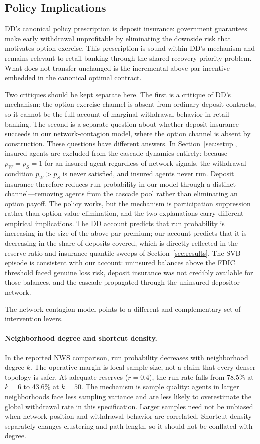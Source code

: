 \documentclass[12pt]{article}\usepackage[]{graphicx}\usepackage[]{xcolor}
\begin{document}
\subsection{Policy Implications}

DD's canonical policy prescription is deposit insurance: government guarantees make early withdrawal unprofitable by eliminating the downside risk that motivates option exercise.
This prescription is sound within DD's mechanism and remains relevant to retail banking through the shared recovery-priority problem.
What does not transfer unchanged is the incremental above-par incentive embedded in the canonical optimal contract.

Two critiques should be kept separate here.
The first is a critique of DD's mechanism: the option-exercise channel is absent from ordinary deposit contracts, so it cannot be the full account of marginal withdrawal behavior in retail banking.
The second is a separate question about whether deposit insurance succeeds in our network-contagion model, where the option channel is absent by construction.
These questions have different answers.
In Section~\ref{sec:setup}, insured agents are excluded from the cascade dynamics entirely: because $p_W = p_S = 1$ for an insured agent regardless of network signals, the withdrawal condition $p_W > p_S$ is never satisfied, and insured agents never run.
Deposit insurance therefore reduces run probability in our model through a distinct channel---removing agents from the cascade pool rather than eliminating an option payoff.
The policy works, but the mechanism is participation suppression rather than option-value elimination, and the two explanations carry different empirical implications.
The DD account predicts that run probability is increasing in the size of the above-par premium; our account predicts that it is decreasing in the share of deposits covered, which is directly reflected in the reserve ratio and insurance quantile sweeps of Section~\ref{sec:results}.
The SVB episode is consistent with our account: uninsured balances above the FDIC threshold faced genuine loss risk, deposit insurance was not credibly available for those balances, and the cascade propagated through the uninsured depositor network.

The network-contagion model points to a different and complementary set of intervention levers.

\paragraph{Neighborhood degree and shortcut density.}
In the reported NWS comparison, run probability decreases with neighborhood degree $k$.
The operative margin is local sample size, not a claim that every denser topology is safer.
At adequate reserves ($r = 0.4$), the run rate falls from 78.5\% at $k = 6$ to 43.6\% at $k = 50$.
The mechanism is sample quality: agents in larger neighborhoods face less sampling variance and are less likely to overestimate the global withdrawal rate in this specification.
Larger samples need not be unbiased when network position and withdrawal behavior are correlated.
Shortcut density separately changes clustering and path length, so it should not be conflated with degree.
\end{document}
